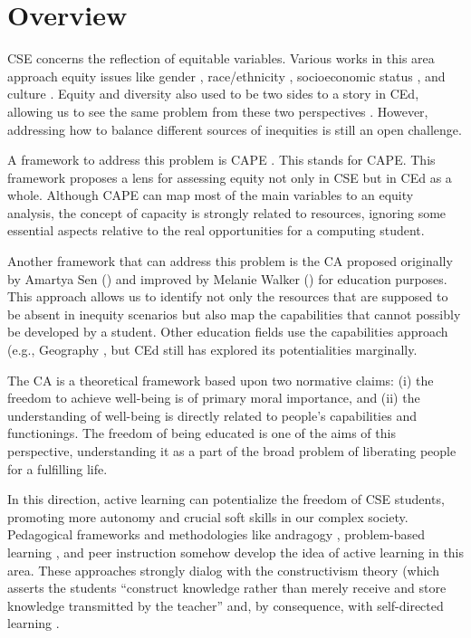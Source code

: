 \section{Overview}
\label{intro-sec:overview}

\gls{CSE} concerns the reflection of equitable variables. Various works in this area approach equity issues like gender \cite{kim:2011}, race/ethnicity \cite{nakajima:2024}, socioeconomic status \cite{parker:2018}, and culture \cite{arawjo:2021}. Equity and diversity also used to be two sides to a story in \acrfull{CEd}, allowing us to see the same problem from these two perspectives \cite{lewis:2019}. However, addressing how to balance different sources of inequities is still an open challenge.

A framework to address this problem is CAPE \cite{fletcher:2021}. This stands for \acrfull{CAPE}. This framework proposes a lens for assessing equity not only in \gls{CSE} but in \gls{CEd} as a whole. Although \gls{CAPE} can map most of the main variables to an equity analysis, the concept of capacity is strongly related to resources, ignoring some essential aspects relative to the real opportunities for a computing student.

Another framework that can address this problem is the \acrfull{CA} proposed originally by Amartya Sen (\citeyear{sen:1992}) and improved by Melanie Walker (\citeyear{walker:2006}) for education purposes. This approach allows us to identify not only the resources that are supposed to be absent in inequity scenarios but also map the capabilities that cannot possibly be developed by a student. Other education fields use the capabilities approach (e.g., Geography \cite{walkington:2018}, but \gls{CEd} still has explored its potentialities marginally.

The \gls{CA} is a theoretical framework based upon two normative claims: (i) the freedom to achieve well-being is of primary moral importance, and (ii) the understanding of well-being is directly related to people’s capabilities and functionings. The freedom of being educated is one of the aims of this perspective, understanding it as a part of the broad problem of liberating people for a fulfilling life.

In this direction, active learning can potentialize the freedom of \gls{CSE} students, promoting more autonomy and crucial soft skills in our complex society. Pedagogical frameworks and methodologies like andragogy \cite{ellis:2002}, problem-based learning \cite{santos:2021}, and peer instruction \cite{bispojr:2021} somehow develop the idea of active learning in this area. These approaches strongly dialog with the constructivism theory (which asserts the students “construct knowledge rather than merely receive and store knowledge transmitted by the teacher” \cite[p.~45]{ben-ari:2001} and, by consequence, with self-directed learning \cite{mccartney:2016}. 

